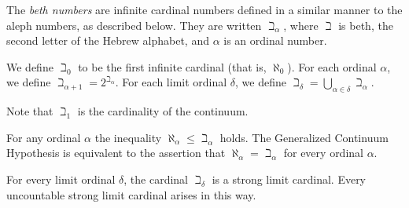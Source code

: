 \documentclass[12pt]{article}
\renewcommand{\leq}{\leqslant}
\begin{document}

The \emph{beth numbers} are infinite cardinal numbers 
defined in a similar manner to the aleph numbers, as described below.
They are written $\beth_\alpha$, where $\beth$ is beth,
the second letter of the Hebrew alphabet,
and $\alpha$ is an ordinal number.

We define $\beth_0$ to be the first infinite cardinal (that is, $\aleph_0$).
For each ordinal $\alpha$,
we define $\beth_{\alpha+1}=2^{\beth_\alpha}$.
For each limit ordinal $\delta$, 
we define $\beth_\delta=\bigcup_{\alpha\in\delta}\beth_\alpha$.

Note that $\beth_1$ is the cardinality of the continuum.

For any ordinal $\alpha$ the inequality $\aleph_\alpha\leq\beth_\alpha$ holds.
The Generalized Continuum Hypothesis is equivalent to the assertion that
$\aleph_\alpha=\beth_\alpha$ for every ordinal $\alpha$.

For every limit ordinal $\delta$, 
the cardinal $\beth_\delta$ is a strong limit cardinal.
Every uncountable strong limit cardinal arises in this way.
\end{document}
